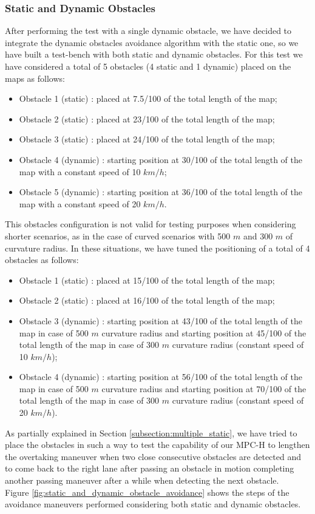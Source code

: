 \subsubsection{Static and Dynamic Obstacles} 

After performing the test with a single dynamic obstacle, we have decided to integrate the dynamic obstacles avoidance algorithm with the static one, so we have built a test-bench with both static and dynamic obstacles. For this test we have considered a total of 5 obstacles (4 static and 1 dynamic) placed on the maps as follows:
\begin{itemize}
    \item Obstacle 1 (static) : placed at 7.5/100 of the total length of the map;
    \item Obstacle 2 (static) : placed at 23/100 of the total length of the map;
    \item Obstacle 3 (static) : placed at 24/100 of the total length of the map;
    \item Obstacle 4 (dynamic) : starting position at 30/100 of the total length of the map with a constant speed of 10 $km/h$;
    \item Obstacle 5 (dynamic) : starting position at 36/100 of the total length of the map with a constant speed of 20 $km/h$.
\end{itemize}

This obstacles configuration is not valid for testing purposes when considering shorter scenarios, as in the case of curved scenarios with 500 $m$ and 300 $m$ of curvature radius. In these situations, we have tuned the positioning of a total of 4 obstacles as follows:
\begin{itemize}
    \item Obstacle 1 (static) : placed at 15/100 of the total length of the map;
    \item Obstacle 2 (static) : placed at 16/100 of the total length of the map;
    \item Obstacle 3 (dynamic) : starting position at 43/100 of the total length of the map in case of 500 $m$ curvature radius and starting position at 45/100 of the total length of the map in case of 300 $m$ curvature radius (constant speed of 10 $km/h$);
    \item Obstacle 4 (dynamic) : starting position at 56/100 of the total length of the map in case of 500 $m$ curvature radius and starting position at 70/100 of the total length of the map in case of 300 $m$ curvature radius (constant speed of 20 $km/h$).
\end{itemize}
As partially explained in Section \ref{subsection:multiple_static}, we have tried to place the obstacles in such a way to test the capability of our MPC-H to lengthen the overtaking maneuver when two close consecutive obstacles are detected and to come back to the right lane after passing an obstacle in motion completing another passing maneuver after a while when detecting the next obstacle. 
\\Figure \ref{fig:static_and_dynamic_obstacle_avoidance} shows the steps of the avoidance maneuvers performed considering both static and dynamic obstacles.


